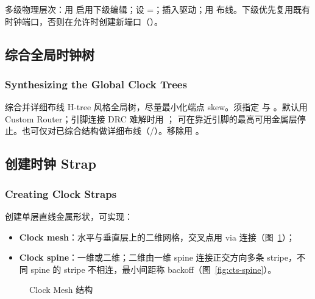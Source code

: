 多级物理层次：用  启用下级编辑；设 =；插入驱动；用  布线。下级优先复用既有时钟端口，否则在允许时创建新端口（）。

\subsection{综合全局时钟树}
\subsubsection*{Synthesizing the Global Clock Trees}

 综合并详细布线 H-tree 风格全局树，尽量最小化端点 skew。须指定  与 。默认用 Custom Router；引脚连接 DRC 难解时用 ； 可在靠近引脚的最高可用金属层停止。也可仅对已综合结构做详细布线（/）。移除用 。

\subsection{创建时钟 Strap}
\subsubsection*{Creating Clock Straps}

 创建单层直线金属形状，可实现：
\begin{itemize}
  \item \textbf{Clock mesh}：水平与垂直层上的二维网格，交叉点用 via 连接（图~\ref{fig:cts-mesh}）；
  \item \textbf{Clock spine}：一维或二维；二维由一维 spine 连接正交方向多条 stripe，不同 spine 的 stripe 不相连，最小间距称 backoff（图~\ref{fig:cts-spine}）。
\end{itemize}

\begin{figure}[htbp]
\centering
{}
\caption{Clock Mesh 结构}
\label{fig:cts-mesh}
\end{figure}

